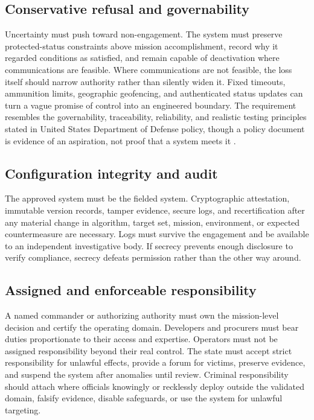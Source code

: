 \documentclass[11pt]{article}
\begin{document}
\subsection{Conservative refusal and governability}

Uncertainty must push toward non-engagement. The system must preserve protected-status constraints above mission accomplishment, record why it regarded conditions as satisfied, and remain capable of deactivation where communications are feasible. Where communications are not feasible, the loss itself should narrow authority rather than silently widen it. Fixed timeouts, ammunition limits, geographic geofencing, and authenticated status updates can turn a vague promise of control into an engineered boundary. The requirement resembles the governability, traceability, reliability, and realistic testing principles stated in United States Department of Defense policy, though a policy document is evidence of an aspiration, not proof that a system meets it \citep{dod2023}.

\subsection{Configuration integrity and audit}

The approved system must be the fielded system. Cryptographic attestation, immutable version records, tamper evidence, secure logs, and recertification after any material change in algorithm, target set, mission, environment, or expected countermeasure are necessary. Logs must survive the engagement and be available to an independent investigative body. If secrecy prevents enough disclosure to verify compliance, secrecy defeats permission rather than the other way around.

\subsection{Assigned and enforceable responsibility}

A named commander or authorizing authority must own the mission-level decision and certify the operating domain. Developers and procurers must bear duties proportionate to their access and expertise. Operators must not be assigned responsibility beyond their real control. The state must accept strict responsibility for unlawful effects, provide a forum for victims, preserve evidence, and suspend the system after anomalies until review. Criminal responsibility should attach where officials knowingly or recklessly deploy outside the validated domain, falsify evidence, disable safeguards, or use the system for unlawful targeting.
\end{document}
